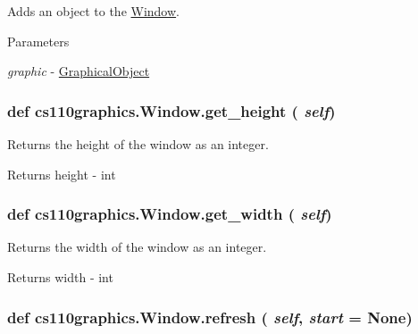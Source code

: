 Adds an object to the \hyperlink{classcs110graphics_1_1Window}{Window}. 
\begin{DoxyParams}{Parameters}
\item[{\em graphic}]-\/ \hyperlink{classcs110graphics_1_1GraphicalObject}{GraphicalObject} \end{DoxyParams}
\hypertarget{classcs110graphics_1_1Window_a2ab7070110bd58c95e8f29c10d71c7cc}{
\subsubsection[{get\_\-height}]{\setlength{\rightskip}{0pt plus 5cm}def cs110graphics.Window.get\_\-height ( {\em self})}}
\label{classcs110graphics_1_1Window_a2ab7070110bd58c95e8f29c10d71c7cc}


Returns the height of the window as an integer. \begin{DoxyReturn}{Returns}
height -\/ int 
\end{DoxyReturn}
\hypertarget{classcs110graphics_1_1Window_a41d27bb09f5033f0596af9f1a3a9b519}{
\subsubsection[{get\_\-width}]{\setlength{\rightskip}{0pt plus 5cm}def cs110graphics.Window.get\_\-width ( {\em self})}}
\label{classcs110graphics_1_1Window_a41d27bb09f5033f0596af9f1a3a9b519}


Returns the width of the window as an integer. \begin{DoxyReturn}{Returns}
width -\/ int 
\end{DoxyReturn}
\hypertarget{classcs110graphics_1_1Window_a683be16067bd2cfe72b14b421b7ba535}{
\subsubsection[{refresh}]{\setlength{\rightskip}{0pt plus 5cm}def cs110graphics.Window.refresh ( {\em self}, \/   {\em start} = {\ttfamily None})}}
\label{classcs110graphics_1_1Window_a683be16067bd2cfe72b14b421b7ba535}


